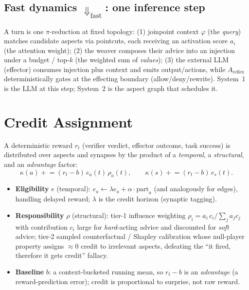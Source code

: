 \documentclass[11pt]{article}
\theoremstyle{definition}
\begin{document}
\subsection{Fast dynamics $\Downarrow_\text{fast}$: one inference step}
\label{sec:fast}
A turn is one $\pi$-reduction at fixed topology:
(1) joinpoint context $\varphi$ (the \emph{query}) matches candidate aspects
via pointcuts, each receiving an activation score $a_i$ (the attention
weight); (2) the weaver composes their advice into an injection under a
budget / top-$k$ (the weighted sum of \emph{values}); (3) the external LLM
(effector) consumes injection plus context and emits output/actions, while
$A_\text{reflex}$ deterministically gates at the effecting boundary
(allow/deny/rewrite). System~1 is the LLM at this step; System~2 is the
aspect graph that schedules it.

\section{Credit Assignment}
\label{sec:credit}

A deterministic reward $r_t$ (verifier verdict, effector outcome, task
success) is distributed over aspects and synapses by the product of a
\emph{temporal}, a \emph{structural}, and an \emph{advantage} factor:
\begin{equation}
\kappa(a)\mathrel{+}=(r_t-b)\,e_a(t)\,\rho_a(t),
\qquad
\kappa(s)\mathrel{+}=(r_t-b)\,e_s(t).
\label{eq:credit}
\end{equation}
\begin{itemize}[leftmargin=1.4em,itemsep=1pt]
\item \textbf{Eligibility} $e$ (temporal): $e_a\leftarrow\lambda e_a+\alpha\cdot\text{part}_a$
  (and analogously for edges), handling delayed reward; $\lambda$ is the
  credit horizon (synaptic tagging).
\item \textbf{Responsibility} $\rho$ (structural): tier-1
  influence weighting $\rho_i=a_i\,c_i/\sum_j a_j c_j$ with contribution
  $c_i$ large for \emph{hard}-acting advice and discounted for \emph{soft}
  advice; tier-2 sampled counterfactual / Shapley calibration whose
  null-player property assigns $\approx 0$ credit to irrelevant aspects,
  defeating the ``it fired, therefore it gets credit'' fallacy.
\item \textbf{Baseline} $b$: a context-bucketed running mean, so
  $r_t-b$ is an \emph{advantage} (a reward-prediction error); credit is
  proportional to surprise, not raw reward.
\end{itemize}
\end{document}

